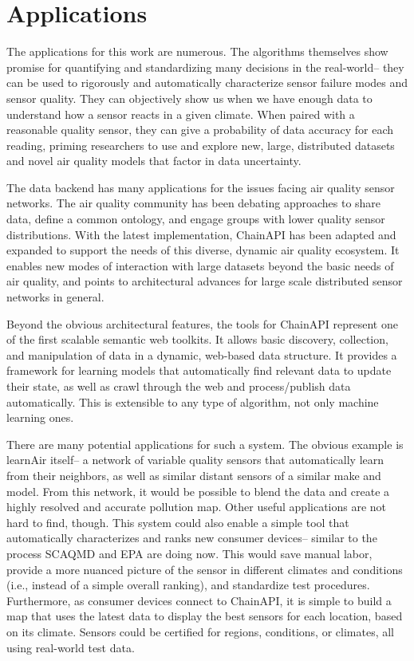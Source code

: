 \section{Applications}

The applications for this work are numerous.  The algorithms themselves show promise for quantifying and standardizing many decisions in the real-world--  they can be used to rigorously and automatically characterize sensor failure modes and sensor quality.  They can objectively show us when we have enough data to understand how a sensor reacts in a given climate.  When paired with a reasonable quality sensor, they can give a probability of data accuracy for each reading, priming researchers to use and explore new, large, distributed datasets and novel air quality models that factor in data uncertainty.

The data backend has many applications for the issues facing air quality sensor networks.  The air quality community has been debating approaches to share data, define a common ontology, and engage groups with lower quality sensor distributions.   With the latest implementation, ChainAPI has been adapted and expanded to support the needs of this diverse, dynamic air quality ecosystem.   It enables new modes of interaction with large datasets beyond the basic needs of air quality, and points to architectural advances for large scale distributed sensor networks in general. 

Beyond the obvious architectural features, the tools for ChainAPI represent one of the first scalable semantic web toolkits.  It allows basic discovery, collection, and manipulation of data in a dynamic, web-based data structure.   It provides a framework for learning models that automatically find relevant data to update their state, as well as crawl through the web and process/publish data automatically.  This is extensible to any type of algorithm, not only machine learning ones.  

There are many potential applications for such a system.  The obvious example is learnAir itself-- a network of variable quality sensors that automatically learn from their neighbors, as well as similar distant sensors of a similar make and model.  From this network, it would be possible to blend the data and create a highly resolved and accurate pollution map.  Other useful applications are not hard to find, though.  This system could also enable a simple tool that automatically characterizes and ranks new consumer devices-- similar to the process SCAQMD and EPA are doing now.  This would save manual labor, provide a more nuanced picture of the sensor in different climates and conditions (i.e., instead of a simple overall ranking), and standardize test procedures.  Furthermore, as consumer devices connect to ChainAPI, it is simple to build a map that uses the latest data to display the best sensors for each location, based on its climate.  Sensors could be certified for regions, conditions, or climates, all using real-world test data.

